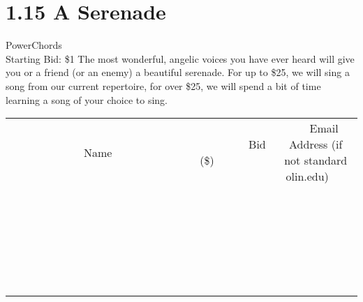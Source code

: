 \documentclass[11pt]{article}
\begin{document}
\section*{1.15 A Serenade}
PowerChords
\\
Starting Bid: \$1
\newline
The most wonderful, angelic voices you have ever heard will give you or a friend (or an enemy) a beautiful serenade. For up to \$25, we will sing a song from our current repertoire, for over \$25, we will spend a bit of time learning a song of your choice to sing.
\\[6ex]
\begin{tabular}{c c c}
~~~~~~~~~~~~~Name~~~~~~~~~~~~~ & ~~~~~~~~~Bid (\$)~~~~~~~~~  & ~~~Email Address (if not standard olin.edu)~~~\\
 & & \\
\hline
 & & \\
\hline
 & & \\
\hline
 & & \\
\hline
 & & \\
\hline
 & & \\
\hline
 & & \\
\hline
 & & \\
\hline
 & & \\
\hline
 & & \\
\hline
 & & \\
\hline
 & & \\
\hline
 & & \\
\hline
 & & \\
\hline
 & & \\
\hline
 & & \\
\hline
 & & \\
\hline
 & & \\
\hline
 & & \\
\hline
 & & \\
\hline
 & & \\
\hline
 & & \\
\hline
 & & \\
\hline
 & & \\
\hline
 & & \\
\hline
 & & \\
\hline
\end{tabular}
\newpage
\end{document}
